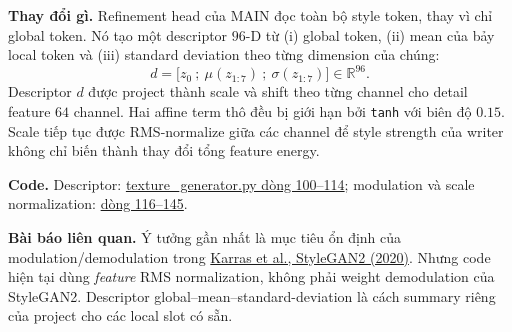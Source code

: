 \documentclass[10pt,a4paper]{article}
\newcommand{\paper}[2]{\href{#1}{#2}}
\begin{document}
\textbf{Thay đổi gì.} Refinement head của MAIN đọc toàn bộ style token, thay vì chỉ global token. Nó tạo một descriptor $96$-D từ (i) global token, (ii) mean của bảy local token và (iii) standard deviation theo từng dimension của chúng:
\[
 d=\big[z_0\ ;\ \mu(z_{1:7})\ ;\ \sigma(z_{1:7})\big]\in\mathbb{R}^{96}.
\]
Descriptor $d$ được project thành scale và shift theo từng channel cho detail feature $64$ channel. Hai affine term thô đều bị giới hạn bởi \texttt{tanh} với biên độ $0.15$. Scale tiếp tục được RMS-normalize giữa các channel để style strength của writer không chỉ biến thành thay đổi tổng feature energy.

\textbf{Code.} Descriptor: \href{https://github.com/rquq/HGGAN_test/blob/main/networks/texture_generator.py\#L100-L114}{texture\_generator.py dòng 100--114}; modulation và scale normalization: \href{https://github.com/rquq/HGGAN_test/blob/main/networks/texture_generator.py\#L116-L145}{dòng 116--145}.

\textbf{Bài báo liên quan.} Ý tưởng gần nhất là mục tiêu ổn định của modulation/demodulation trong \paper{https://arxiv.org/abs/1912.04958}{Karras et al., StyleGAN2 (2020)}. Nhưng code hiện tại dùng \emph{feature} RMS normalization, không phải weight demodulation của StyleGAN2. Descriptor global--mean--standard-deviation là cách summary riêng của project cho các local slot có sẵn.

\begin{center}
\end{center}
\end{document}
